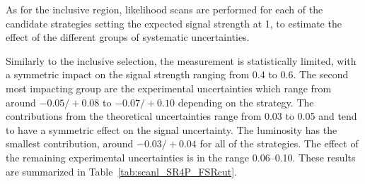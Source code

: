\label{sec:unblinded_4L_FSRcut}

As for the inclusive region, likelihood scans are performed for each of the candidate strategies
setting the expected signal strength at 1,
to estimate the effect of the different groups of systematic uncertainties.

Similarly to the inclusive selection, the measurement is statistically limited,
with a symmetric impact on the signal strength ranging from 0.4 to 0.6.
The second most impacting group are the experimental uncertainties
which range from around ${-}0.05/{+}0.08$ to ${-}0.07/{+}0.10$ depending on the strategy.
The contributions from the theoretical uncertainties range from 0.03 to 0.05 and tend to have a symmetric effect on the signal uncertainty.
The luminosity has the smallest contribution, around ${-}0.03/{+}0.04$ for all of the strategies.
The effect of the remaining experimental uncertainties is in the range 0.06--0.10.
These results are summarized in Table~\ref{tab:scanl_SR4P_FSRcut}.

